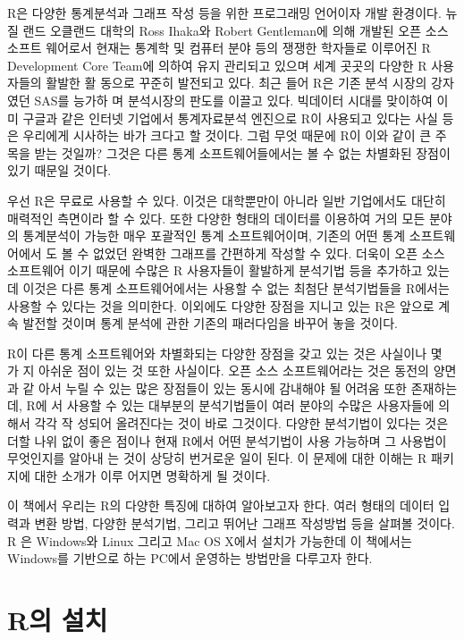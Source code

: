 \documentclass[
]{book}
\begin{document}
R은 다양한 통계분석과 그래프 작성 등을 위한 프로그래밍 언어이자 개발
환경이다. 뉴질 랜드 오클랜드 대학의 Ross Ihaka와 Robert Gentleman에 의해
개발된 오픈 소스 소프트 웨어로서 현재는 통계학 및 컴퓨터 분야 등의
쟁쟁한 학자들로 이루어진 R Development Core Team에 의하여 유지 관리되고
있으며 세계 곳곳의 다양한 R 사용자들의 활발한 활 동으로 꾸준히 발전되고
있다. 최근 들어 R은 기존 분석 시장의 강자였던 SAS를 능가하 며 분석시장의
판도를 이끌고 있다. 빅데이터 시대를 맞이하여 이미 구글과 같은 인터넷
기업에서 통계자료분석 엔진으로 R이 사용되고 있다는 사실 등은 우리에게
시사하는 바가 크다고 할 것이다. 그럼 무엇 때문에 R이 이와 같이 큰 주목을
받는 것일까? 그것은 다른 통계 소프트웨어들에서는 볼 수 없는 차별화된
장점이 있기 때문일 것이다.

우선 R은 무료로 사용할 수 있다. 이것은 대학뿐만이 아니라 일반 기업에서도
대단히 매력적인 측면이라 할 수 있다. 또한 다양한 형태의 데이터를
이용하여 거의 모든 분야의 통계분석이 가능한 매우 포괄적인 통계
소프트웨어이며, 기존의 어떤 통계 소프트웨어에서 도 볼 수 없었던 완벽한
그래프를 간편하게 작성할 수 있다. 더욱이 오픈 소스 소프트웨어 이기
때문에 수많은 R 사용자들이 활발하게 분석기법 등을 추가하고 있는데 이것은
다른 통계 소프트웨어에서는 사용할 수 없는 최첨단 분석기법들을 R에서는
사용할 수 있다는 것을 의미한다. 이외에도 다양한 장점을 지니고 있는 R은
앞으로 계속 발전할 것이며 통계 분석에 관한 기존의 패러다임을 바꾸어 놓을
것이다.

R이 다른 통계 소프트웨어와 차별화되는 다양한 장점을 갖고 있는 것은
사실이나 몇 가 지 아쉬운 점이 있는 것 또한 사실이다. 오픈 소스
소프트웨어라는 것은 동전의 양면과 같 아서 누릴 수 있는 많은 장점들이
있는 동시에 감내해야 될 어려움 또한 존재하는데, R에 서 사용할 수 있는
대부분의 분석기법들이 여러 분야의 수많은 사용자들에 의해서 각각 작
성되어 올려진다는 것이 바로 그것이다. 다양한 분석기법이 있다는 것은 더할
나위 없이 좋은 점이나 현재 R에서 어떤 분석기법이 사용 가능하며 그
사용법이 무엇인지를 알아내 는 것이 상당히 번거로운 일이 된다. 이 문제에
대한 이해는 R 패키지에 대한 소개가 이루 어지면 명확하게 될 것이다.

이 책에서 우리는 R의 다양한 특징에 대하여 알아보고자 한다. 여러 형태의
데이터 입 력과 변환 방법, 다양한 분석기법, 그리고 뛰어난 그래프 작성방법
등을 살펴볼 것이다. R 은 Windows와 Linux 그리고 Mac OS X에서 설치가
가능한데 이 책에서는 Windows를 기반으로 하는 PC에서 운영하는 방법만을
다루고자 한다.

\hypertarget{ruxc758-uxc124uxce58}{%
\section{R의 설치}\label{ruxc758-uxc124uxce58}}
\end{document}
